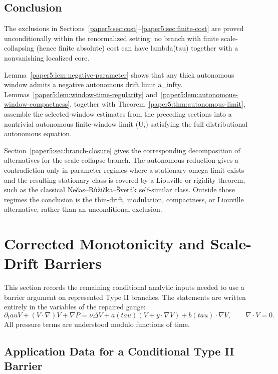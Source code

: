 \documentclass[11pt]{amsart}
\def\({}%
\def\){}%
\def\tau{tau}%
\def\lambda{lambda}%
\def\infty{infty}%
\theoremstyle{plain}
\theoremstyle{definition}
\theoremstyle{remark}
\begin{document}
\subsection{Conclusion}

The exclusions in Sections~\ref{paper5:sec:cost}--\ref{paper5:sec:finite-cost} are proved unconditionally within
the renormalized setting:
no branch with finite scale-collapsing (hence finite absolute) cost can have
\(\lambda(\tau)\) together with a nonvanishing localized core.

Lemma~\ref{paper5:lem:negative-parameter} shows that any thick autonomous window admits a negative
autonomous drift limit \(a_\infty\).  Lemmas~\ref{paper5:lem:window-time-regularity}
and~\ref{paper5:lem:autonomous-window-compactness}, together with Theorem~\ref{paper5:thm:autonomous-limit},
assemble the selected-window estimates from the preceding sections into a nontrivial autonomous
finite-window limit \((U,\Pi)\) satisfying the full distributional autonomous equation.

Section~\ref{paper5:sec:branch-closure} gives the corresponding decomposition of alternatives for the scale-collapse branch.  The autonomous reduction gives a contradiction only in parameter regimes where a
stationary omega-limit exists and the resulting stationary class is covered by a Liouville
or rigidity theorem, such as the classical Nečas--Růžička--Šverák self-similar class.  Outside
those regimes the conclusion is the thin-drift, modulation, compactness, or
Liouville alternative, rather than an unconditional exclusion.

\clearpage
\section{Corrected Monotonicity and Scale-Drift Barriers}
\label{sec:corrected-monotonicity-scale-drift}

This section records the remaining conditional analytic inputs needed to use a
barrier argument on represented Type II branches.  The statements are written
entirely in the variables of the repaired gauge:
\[
  \partial_\tau V+(V\cdot\nabla)V+\nabla P
  =
  \nu\Delta V+a(\tau)(V+y\cdot\nabla V)+b(\tau)\cdot\nabla V,
  \qquad \nabla\cdot V=0.
\]
All pressure terms are understood modulo functions of time.

\subsection{Application Data for a Conditional Type II Barrier}
\end{document}
